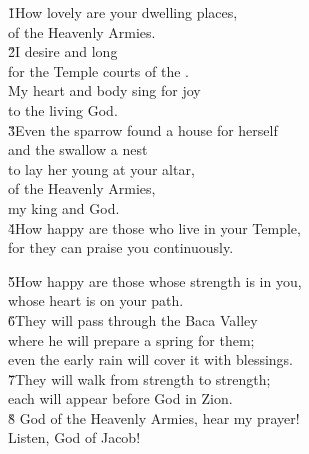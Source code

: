 \begin{poetry}
\poeml \v{1}How lovely are your dwelling places, \\
\poemll    {} of the Heavenly Armies. \\
\poeml \v{2}I desire and long \\
\poemll    for the Temple courts of the . \\
\poeml My heart and body sing for joy \\
\poemll    to the living God. \\
\poeml \v{3}Even the sparrow found a house for herself \\
\poemll    and the swallow a nest \\
\poeml to lay her young at your altar, \\
\poemll    {} of the Heavenly Armies, \\
\poemlll       my king and God. \\
\poeml \v{4}How happy are those who live in your Temple, \\
\poemll    for they can praise you continuously.
\end{poetry}

\begin{poetry}
\poeml \v{5}How happy are those whose strength is in you, \\
\poemll    whose heart is on your path. \\
\poeml \v{6}They will pass through the Baca Valley \\
\poemll    where he will prepare a spring for them; \\
\poemlll       even the early rain will cover it with blessings. \\
\poeml \v{7}They will walk from strength to strength; \\
\poemll    each will appear before God in Zion. \\
\poeml \v{8} God of the Heavenly Armies, hear my prayer! \\
\poemll    Listen, God of Jacob!
\end{poetry}

